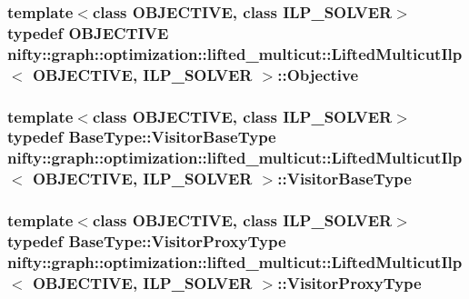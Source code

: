 \subsubsection[{Objective}]{\setlength{\rightskip}{0pt plus 5cm}template$<$class O\+B\+J\+E\+C\+T\+I\+V\+E, class I\+L\+P\+\_\+\+S\+O\+L\+V\+E\+R$>$ typedef O\+B\+J\+E\+C\+T\+I\+V\+E {\bf nifty\+::graph\+::optimization\+::lifted\+\_\+multicut\+::\+Lifted\+Multicut\+Ilp}$<$ O\+B\+J\+E\+C\+T\+I\+V\+E, I\+L\+P\+\_\+\+S\+O\+L\+V\+E\+R $>$\+::{\bf Objective}}\label{classnifty_1_1graph_1_1optimization_1_1lifted__multicut_1_1LiftedMulticutIlp_acde6c20c80ff731341a83218d4c6fcd7}
\hypertarget{classnifty_1_1graph_1_1optimization_1_1lifted__multicut_1_1LiftedMulticutIlp_a2e08b1b4250ea071d1ecb321e1fd5c06}{}
\subsubsection[{Visitor\+Base\+Type}]{\setlength{\rightskip}{0pt plus 5cm}template$<$class O\+B\+J\+E\+C\+T\+I\+V\+E, class I\+L\+P\+\_\+\+S\+O\+L\+V\+E\+R$>$ typedef {\bf Base\+Type\+::\+Visitor\+Base\+Type} {\bf nifty\+::graph\+::optimization\+::lifted\+\_\+multicut\+::\+Lifted\+Multicut\+Ilp}$<$ O\+B\+J\+E\+C\+T\+I\+V\+E, I\+L\+P\+\_\+\+S\+O\+L\+V\+E\+R $>$\+::{\bf Visitor\+Base\+Type}}\label{classnifty_1_1graph_1_1optimization_1_1lifted__multicut_1_1LiftedMulticutIlp_a2e08b1b4250ea071d1ecb321e1fd5c06}
\hypertarget{classnifty_1_1graph_1_1optimization_1_1lifted__multicut_1_1LiftedMulticutIlp_a1d6ef354f5ba27268ea186b9eb4ea4f5}{}
\subsubsection[{Visitor\+Proxy\+Type}]{\setlength{\rightskip}{0pt plus 5cm}template$<$class O\+B\+J\+E\+C\+T\+I\+V\+E, class I\+L\+P\+\_\+\+S\+O\+L\+V\+E\+R$>$ typedef {\bf Base\+Type\+::\+Visitor\+Proxy\+Type} {\bf nifty\+::graph\+::optimization\+::lifted\+\_\+multicut\+::\+Lifted\+Multicut\+Ilp}$<$ O\+B\+J\+E\+C\+T\+I\+V\+E, I\+L\+P\+\_\+\+S\+O\+L\+V\+E\+R $>$\+::{\bf Visitor\+Proxy\+Type}}\label{classnifty_1_1graph_1_1optimization_1_1lifted__multicut_1_1LiftedMulticutIlp_a1d6ef354f5ba27268ea186b9eb4ea4f5}


